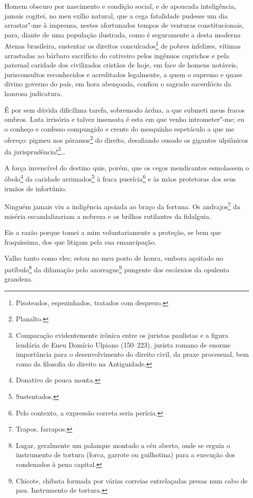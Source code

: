 \noindent{}Homem obscuro por nascimento e condição social, e de apoucada
inteligência, jamais cogitei, no meu exílio natural, que a cega
fatalidade pudesse um dia arrastar"-me à imprensa, nestes afortunados
tempos de venturas constitucionais, para, diante de uma população
ilustrada, como é seguramente a desta moderna Atenas brasileira,
sustentar os direitos conculcados\footnote{Pisoteados, espezinhados,
  tratados com desprezo.} de pobres infelizes, vítimas arrastadas ao
bárbaro sacrifício do cativeiro pelos ingênuos caprichos e pela paternal
caridade dos civilizados cristãos de hoje, em face de homens notáveis,
jurisconsultos reconhecidos e acreditados legalmente, a quem o supremo e
quase divino governo do país, em hora abençoada, confiou o sagrado
sacerdócio da honrosa judicatura.

É por sem dúvida dificílima tarefa, sobremodo árdua, a que submeti meus
fracos ombros. Luta irrisória e talvez insensata é esta em que venho
intrometer"-me; eu o conheço e confesso compungido e crente do mesquinho
espetáculo a que me ofereço: pigmeu nos páramos\footnote{Planalto.} do
direito, desafiando ousado os gigantes ulpiânicos da
jurisprudência!\footnote{Comparação evidentemente irônica entre os
  juristas paulistas e a figura lendária de Eneu Domício Ulpiano
  (150--223), jurista romano de enorme importância para o desenvolvimento
  do direito civil, da praxe processual, bem como da filosofia do
  direito na Antiguidade.}\ldots{}

A força invencível do destino quis, porém, que os cegos mendicantes
esmolassem o óbolo\footnote{Donativo de pouca monta.} da caridade
arrimados\footnote{Sustentados.} à fraca puerícia\footnote{Pelo
  contexto, a expressão correta seria perícia.} e às mãos protetoras dos
seus irmãos de infortúnio.

Ninguém jamais viu a indigência apoiada ao braço da fortuna. Os
andrajos\footnote{Trapos, farrapos.} da miséria escandalizariam a
nobreza e os brilhos rutilantes da fidalguia.

Eis a razão porque tomei a mim voluntariamente a proteção, se bem que
fraquíssima, dos que litigam pela sua emancipação.

Valho tanto como eles; estou no meu posto de honra, embora açoitado no
patíbulo\footnote{Lugar, geralmente um palanque montado a céu aberto,
  onde se erguia o instrumento de tortura (forca, garrote ou guilhotina)
  para a execução dos condenados à pena capital.} da difamação pelo
azorrague\footnote{Chicote, chibata formada por várias correias
  entrelaçadas presas num cabo de pau. Instrumento de tortura.} pungente
dos escárnios da opulenta grandeza.

